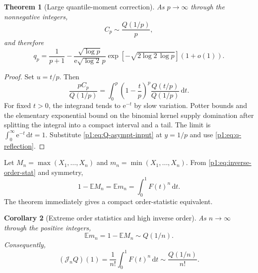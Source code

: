 \documentclass[11pt,oneside]{article}
\newtheorem{theorem}{Theorem}[section]
\newtheorem{corollary}[theorem]{Corollary}
\theoremstyle{definition}
\theoremstyle{remark}
\newcommand{\E}{\mathbb E}
\newcommand{\dd}{\,\mathrm d}
\newcommand{\e}{\mathrm e}
\newcommand{\Jn}{\mathcal J}
\newcommand{\1}{\mathbf 1}
\begin{document}
\begin{theorem}[Large quantile-moment correction]\label{p1:thm:large-quantile}
As \(p\to\infty\) through the nonnegative integers,
\begin{equation}
 C_p\sim\frac{Q(1/p)}p,                                       \label{p1:eq:Cp-asympt}
\end{equation}
and therefore
\begin{equation}
 \boxed{\quad
 q_p=\frac1{p+1}
 -\frac{\sqrt{\log p}}{\e\sqrt{\log2}\,p}
 \exp\!\left[-\sqrt{2\log2\,\log p}\right](1+o(1)).
 \quad}                                                        \label{p1:eq:qp-asympt}
\end{equation}
\end{theorem}

\begin{proof}
Set \(u=t/p\).  Then
\[
 \frac{pC_p}{Q(1/p)}
 =\int_0^p\left(1-\frac tp\right)^p
 \frac{Q(t/p)}{Q(1/p)}\dd t.
\]
For fixed \(t>0\), the integrand tends to \(\e^{-t}\) by slow variation.
Potter bounds and the elementary exponential bound on the binomial kernel
supply domination after splitting the integral into a compact interval and a
tail.  The limit is \(\int_0^\infty\e^{-t}\dd t=1\).  Substitute
\eqref{p1:eq:Q-asympt-input} at \(y=1/p\) and use
\eqref{p1:eq:q-reflection}.
\end{proof}

Let \(M_n=\max(X_1,\ldots,X_n)\) and
\(m_n=\min(X_1,\ldots,X_n)\).  From
\eqref{p1:eq:inverse-order-stat} and symmetry,
\begin{equation}
 1-\E M_n=\E m_n=\int_0^1F(t)^n\dd t.                           \label{p1:eq:order-stat-id}
\end{equation}
The theorem immediately gives a compact order-statistic equivalent.

\begin{corollary}[Extreme order statistics and high inverse order]\label{p1:cor:extreme-order}
As \(n\to\infty\) through the positive integers,
\begin{equation}
 \boxed{\quad
 \E m_n=1-\E M_n\sim Q(1/n).
 \quad}                                                        \label{p1:eq:extreme-order-asympt}
\end{equation}
Consequently,
\begin{equation}
 (\Jn_nQ)(1)=\frac1{n!}\int_0^1F(t)^n\dd t
 \sim\frac{Q(1/n)}{n!}.                                       \label{p1:eq:high-inverse-order}
\end{equation}
\end{corollary}
\end{document}
